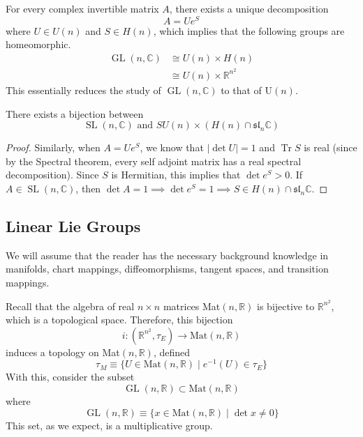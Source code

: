 \documentclass{article}
\DeclareMathOperator{\Tr}{Tr}
\DeclareMathOperator{\GL}{GL}
\DeclareMathOperator{\SL}{SL}
\begin{document}
    \begin{corollary}
      For every complex invertible matrix $A$, there exists a unique decomposition
      \begin{equation}
        A = U e^S
      \end{equation}
      where $U \in U(n)$ and $S \in H(n)$, which implies that the following groups are homeomorphic. 
      \begin{align*}
        \GL(n, \mathbb{C}) & \cong U(n) \times H(n) \\
        & \cong U(n) \times \mathbb{R}^{n^2}
      \end{align*} 
      This essentially reduces the study of $\GL(n, \mathbb{C})$ to that of U$(n)$. 
    \end{corollary}

    \begin{corollary}
      There exists a bijection between 
      \begin{equation}
        \SL(n, \mathbb{C}) \text{ and } SU(n) \times (H(n) \cap \mathfrak{sl}_n \mathbb{C})
      \end{equation}
    \end{corollary}
    \begin{proof}
      Similarly, when $A = U e^S$, we know that $|\det{U}| = 1$ and $\Tr{S}$ is real (since by the Spectral theorem, every self adjoint matrix has a real spectral decomposition). Since $S$ is Hermitian, this implies that $\det{e^S} > 0$. If $A \in \SL(n, \mathbb{C})$, then $\det{A} = 1 \implies \det{e^S} = 1 \implies S \in H(n) \cap \mathfrak{sl}_n \mathbb{C}$. 
    \end{proof}

  \subsection{Linear Lie Groups}

    We will assume that the reader has the necessary background knowledge in manifolds, chart mappings, diffeomorphisms, tangent spaces, and transition mappings. 

    Recall that the algebra of real $n \times n$ matrices Mat$(n, \mathbb{R})$ is bijective to $\mathbb{R}^{n^2}$, which is a topological space. Therefore, this bijection 
    \begin{equation}
      i:(\mathbb{R}^{n^2}, \tau_E) \longrightarrow \text{Mat}(n, \mathbb{R})
    \end{equation}
    induces a topology on Mat$(n, \mathbb{R})$, defined 
    \begin{equation}
      \tau_M \equiv \{U \in \text{Mat}(n, \mathbb{R}) \; | \; e^{-1} (U) \in \tau_E\}
    \end{equation}
    With this, consider the subset
    \begin{equation}
      \GL(n, \mathbb{R}) \subset \text{Mat}(n, \mathbb{R})
    \end{equation}
    where
    \begin{equation}
      \GL(n, \mathbb{R}) \equiv \{x \in \text{Mat}(n, \mathbb{R}) \;|\; \det{x} \neq 0\}
    \end{equation}
    This set, as we expect, is a multiplicative group. 
\end{document}
